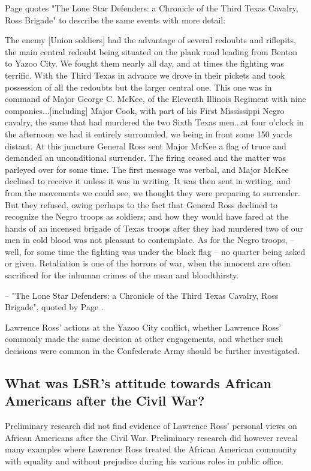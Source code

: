 \documentclass[12pt]{article}
\begin{document}
Page quotes "The Lone Star Defenders: a Chronicle of the Third Texas Cavalry, Ross Brigade" to describe the same events with more detail:
\begin{displayquote}
The enemy [Union soldiers] had the advantage of several redoubts and riflepits, the main central redoubt being situated on the plank road leading from Benton to Yazoo City.  We fought them nearly all day, and at times the fighting was terrific.  With the Third Texas in advance we drove in their pickets and took possession of all the redoubts but the larger central one.  This one was in command of Major George C. McKee, of the Eleventh Illinois Regiment with nine companies...[including] Major Cook, with part of his First Mississippi Negro cavalry, the same that had murdered the two Sixth Texas men...at four o'clock in the afternoon we had it entirely surrounded, we being in front some 150 yards distant. At this juncture General Ross sent Major McKee a flag of truce and demanded an unconditional surrender. The firing ceased and the matter was parleyed over for some time. The first message was verbal, and Major McKee declined to receive it unless it was in writing. It was then sent in writing, and from the movements we could see, we thought they were preparing to surrender. But they refused, owing perhaps to the fact that General Ross declined to recognize the Negro troops as soldiers; and how they would have fared at the hands of an incensed brigade of Texas troops after they had murdered two of our men in cold blood was not pleasant to contemplate. As for the Negro troops, -- well, for some time the fighting was under the black flag -- no quarter being asked or given.  Retaliation is one of the horrors of war, when the innocent are often sacrificed for the inhuman crimes of the mean and bloodthirsty.

-- "The Lone Star Defenders: a Chronicle of the Third Texas Cavalry, Ross Brigade", quoted by Page \cite[pg. 61--62]{page}.
\end{displayquote}

Lawrence Ross' actions at the Yazoo City conflict, whether Lawrence Ross' commonly made the same decision at other engagements, and whether such decisions were common in the Confederate Army should be further investigated. 

\subsection{What was LSR's attitude towards African Americans after the Civil War?}
Preliminary research did not find evidence of Lawrence Ross' personal views on African Americans after the Civil War. Preliminary research did however reveal many examples where Lawrence Ross treated the African American community with equality and without prejudice during his various roles in public office. 
\end{document}
